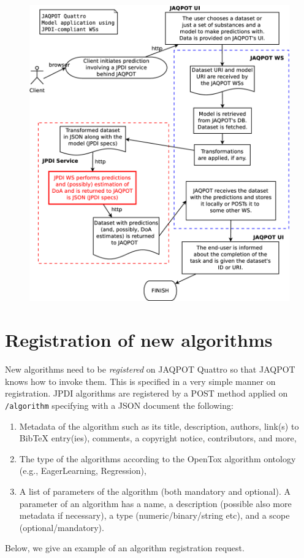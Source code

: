 \begin{figure}
\centering
\includegraphics[keepaspectratio=true,width=0.999\textwidth]{figures/JPDI_prediction.eps}
\end{figure}

\section{Registration of new algorithms}
New algorithms need to be \textit{registered} on JAQPOT Quattro
so that JAQPOT knows how to invoke them. This is specified in 
a very simple manner on registration. JPDI algorithms
are registered by a POST method applied on \texttt{/algorithm}
specifying with a JSON document the following:
\begin{enumerate}
 \item Metadata of the algorithm such as its title, description,
 authors, link(s) to BibTeX entry(ies), comments, a copyright notice,
 contributors, and more,
 \item The type of the algorithms according to the OpenTox algorithm
 ontology (e.g., EagerLearning, Regression),
 \item A list of parameters of the algorithm (both mandatory and optional).
 A parameter of an algorithm has a name, a description (possible also more
 metadata if necessary), a type (numeric/binary/string etc), and
 a scope (optional/mandatory).
\end{enumerate}
Below, we give an example of an algorithm registration request.

